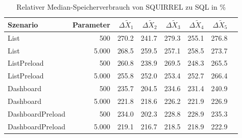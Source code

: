 
\begin{table}[ht]
\setlength{\extrarowheight}{-1pt}
\centering
\caption{Relativer Median-Speicherverbrauch von SQUIRREL zu SQL in \%}
\begin{tabular}{lrrrrrrr}
\toprule
Szenario & Parameter & ${\Delta \tilde{X}_1}$ & ${\Delta \tilde{X}_2}$ & ${\Delta \tilde{X}_3}$ & ${\Delta \tilde{X}_4}$ & ${\Delta \tilde{X}_5}$ \\
\midrule
	List & 500 & \cellcolor{red!50}  270.2 & \cellcolor{red!50}  241.7 & \cellcolor{red!50}  279.3 & \cellcolor{red!50}  255.1 & \cellcolor{red!50}  276.8 \\
	List & 5.000 & \cellcolor{red!50}  268.5 & \cellcolor{red!50}  259.5 & \cellcolor{red!50}  257.1 & \cellcolor{red!50}  258.5 & \cellcolor{red!50}  273.7 \\
	ListPreload & 500 & \cellcolor{red!50}  260.8 & \cellcolor{red!50}  238.9 & \cellcolor{red!50}  269.5 & \cellcolor{red!50}  248.3 & \cellcolor{red!50}  265.5 \\
	ListPreload & 5.000 & \cellcolor{red!50}  255.8 & \cellcolor{red!50}  252.0 & \cellcolor{red!50}  253.4 & \cellcolor{red!50}  252.7 & \cellcolor{red!50}  266.4 \\
	Dashboard & 500 & \cellcolor{red!50}  235.7 & \cellcolor{red!50}  204.5 & \cellcolor{red!50}  234.6 & \cellcolor{red!50}  231.4 & \cellcolor{red!50}  240.9 \\
	Dashboard & 5.000 & \cellcolor{red!50}  221.8 & \cellcolor{red!50}  218.6 & \cellcolor{red!50}  226.2 & \cellcolor{red!50}  221.9 & \cellcolor{red!50}  226.9 \\
	DashboardPreload & 500 & \cellcolor{red!50}  234.0 & \cellcolor{red!50}  202.3 & \cellcolor{red!50}  228.8 & \cellcolor{red!50}  228.9 & \cellcolor{red!50}  235.3 \\
	DashboardPreload & 5.000 & \cellcolor{red!50}  219.1 & \cellcolor{red!50}  216.7 & \cellcolor{red!50}  218.5 & \cellcolor{red!50}  218.9 & \cellcolor{red!50}  222.9 \\
\bottomrule
\end{tabular}
\label{tab:relativer_speicherverbrauch_squirrel}
\end{table}
	